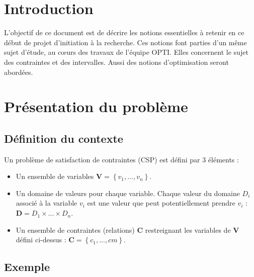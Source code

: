 \section{Introduction }
L'objectif de ce document est de décrire les notions essentielles à retenir en ce début de projet d'initiation à la recherche. Ces notions font parties d'un même sujet d'étude, au cœurs des travaux de l'équipe OPTI. Elles concernent le sujet des contraintes et des intervalles. Aussi des notions d'optimisation seront abordées.

\section{Présentation du problème}
\subsection{Définition du contexte}
Un problème de satisfaction de contraintes (CSP) est défini par 3 éléments : 
\begin{itemize}
\item
Un ensemble de variables $\mathbf{V} = \left\{ v_1,...,v_n \right\}$.
\item
Un domaine de valeurs pour chaque variable. Chaque valeur du domaine $D_i$ associé à la variable $v_i$ est une valeur que peut potentiellement prendre $v_i$ : $\mathbf{D} = D_1 \times ... \times D_n $.
\item
Un ensemble de contraintes (relations) $\mathbf{C}$ restreignant les variables de $\mathbf{V}$ défini ci-dessus :  $\mathbf{C} = \left\{c_1,...,cm\right\}$. 
\end{itemize}



\subsection{Exemple}

